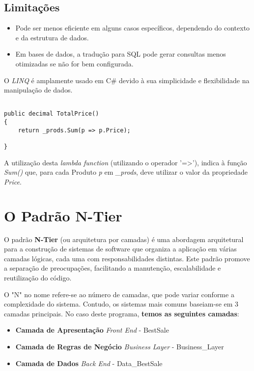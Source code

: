 \documentclass[11pt]{scrartcl} %
\begin{document}
\subsection{Limitações}
\begin{itemize}
	\item Pode ser menos eficiente em alguns casos específicos, dependendo do contexto e da estrutura de dados.
	\item Em bases de dados, a tradução para SQL pode gerar consultas menos otimizadas se não for bem configurada.	
\end{itemize}

O \textit{LINQ} é amplamente usado em C\# devido à sua simplicidade e flexibilidade na manipulação de dados.

\newpage

\begin{lstlisting}[language={[Sharp]C}, caption={Utilização de Função Lambda}, label={Utilização de Função Lambda}]
	
public decimal TotalPrice()
{
	return _prods.Sum(p => p.Price);
	
}
\end{lstlisting}

A utilização desta \textit{lambda function} (utilizando o operador '=>'), indica à função \textit{Sum()} que, para cada Produto \textit{p} em \textit{\_prods}, deve utilizar o valor da propriedade \textit{Price}.

\section{O Padrão N-Tier}
O padrão \textbf{N-Tier} (ou arquitetura por camadas) é uma abordagem arquitetural para a construção de sistemas de software que organiza a aplicação em várias camadas lógicas, cada uma com responsabilidades distintas. Este padrão promove a separação de preocupações, facilitando a manutenção, escalabilidade e reutilização do código.

O "N" no nome refere-se ao número de camadas, que pode variar conforme a complexidade do sistema. Contudo, os sistemas mais comuns baseiam-se em 3 camadas principais.
No caso deste programa, \textbf{temos as seguintes camadas}:
\begin{itemize}
	\item \textbf{Camada de Apresentação} \textit{Front End} - BestSale
	\item \textbf{Camada de Regras de Negócio} \textit{Business Layer} - Business\_Layer
	\item \textbf{Camada de Dados} \textit{Back End} - Data\_BestSale
\end{itemize}
\end{document}
